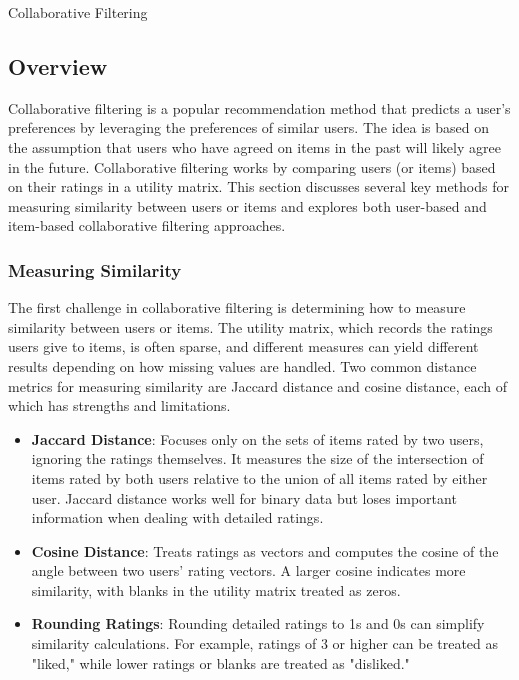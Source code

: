 \begin{notes}{Collaborative Filtering}
    \subsection*{Overview}

    Collaborative filtering is a popular recommendation method that predicts a user's preferences by leveraging the preferences of similar users. The idea is based on the assumption that users who have agreed on items 
    in the past will likely agree in the future. Collaborative filtering works by comparing users (or items) based on their ratings in a utility matrix. This section discusses several key methods for measuring similarity 
    between users or items and explores both user-based and item-based collaborative filtering approaches.
    
    \subsubsection*{Measuring Similarity}
    
    The first challenge in collaborative filtering is determining how to measure similarity between users or items. The utility matrix, which records the ratings users give to items, is often sparse, and different measures 
    can yield different results depending on how missing values are handled. Two common distance metrics for measuring similarity are Jaccard distance and cosine distance, each of which has strengths and limitations.
    
    \begin{highlight}
        \begin{itemize}
            \item \textbf{Jaccard Distance}: Focuses only on the sets of items rated by two users, ignoring the ratings themselves. It measures the size of the intersection of items rated by both users relative to the union 
            of all items rated by either user. Jaccard distance works well for binary data but loses important information when dealing with detailed ratings.
            \item \textbf{Cosine Distance}: Treats ratings as vectors and computes the cosine of the angle between two users' rating vectors. A larger cosine indicates more similarity, with blanks in the utility matrix 
            treated as zeros.
            \item \textbf{Rounding Ratings}: Rounding detailed ratings to 1s and 0s can simplify similarity calculations. For example, ratings of 3 or higher can be treated as "liked," while lower ratings or blanks are 
            treated as "disliked."
        \end{itemize}
    \end{highlight}
    

\end{notes}
